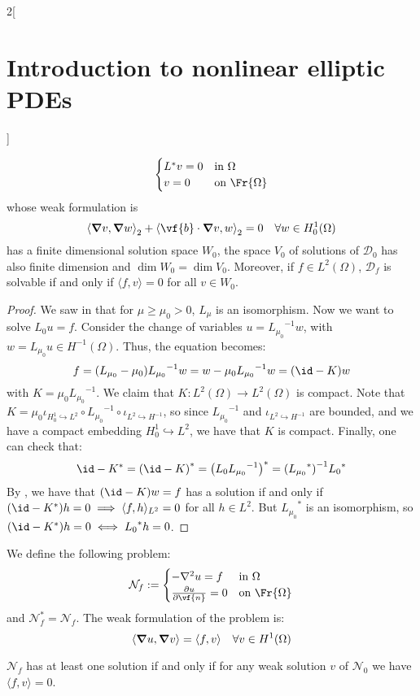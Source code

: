 \documentclass[../../../main_math.tex]{subfiles}
\begin{document}
\begin{multicols}{2}[\section{Introduction to nonlinear elliptic PDEs}]
\begin{proposition}
$$\begin{cases}
        L^*v=0 & \text{in }\Omega      \\
        v=0    & \text{on }\Fr{\Omega}
      \end{cases}
    $$
    whose weak formulation is
    \begin{equation*}
      {\langle \grad v,\grad w\rangle}_2+{\langle \vf{b}\cdot \grad v,w\rangle}_2=0\quad \forall w\in H_0^1(\Omega)
    \end{equation*}
    has a finite dimensional solution space $W_0$, the space $V_0$ of solutions of $\mathcal{D}_0$ has also finite dimension and $\dim W_0=\dim V_0$. Moreover, if $f\in L^2(\Omega)$, $\mathcal{D}_f$ is solvable if and only if $\langle f,v\rangle=0$ for all $v\in W_0$.
  \end{proposition}
  \begin{proof}
    We saw in  that for $\mu\geq \mu_0>0$, $L_\mu$ is an isomorphism. Now we want to solve $L_0u=f$. Consider the change of variables $u={L_{\mu_0}}^{-1}w$, with $w=L_{\mu_0}u\in H^{-1}(\Omega)$. Thus, the equation becomes:
    $$
      f= (L_{\mu_0}-\mu_0){L_{\mu_0}}^{-1}w=w-\mu_0 {L_{\mu_0}}^{-1}w=(\id-K)w
    $$
    with $K=\mu_0 {L_{\mu_0}}^{-1}$. We claim that $K:L^2(\Omega)\to L^2(\Omega)$ is compact. Note that $K=\mu_0\iota_{H_0^1\hookrightarrow L^2}\circ {L_{\mu_0}}^{-1}\circ \iota_{L^2\hookrightarrow H^{-1}}$, so since ${L_{\mu_0}}^{-1}$ and $\iota_{L^2\hookrightarrow H^{-1}}$ are bounded, and we have a compact embedding $H_0^1\hookrightarrow L^2$, we have that $K$ is compact. Finally, one can check that:
    $$
      \id-K^*={(\id-K)}^*={\left(L_0{L_{\mu_0}}^{-1}\right)}^*={({L_{\mu_0}}^*)}^{-1}{L_0}^{*}
    $$
    By , we have that $(\id-K)w=f$ has a solution if and only if $(\id-K^*)h=0\implies \langle f,h\rangle_{L^2} =0$ for all $h\in L^2$. But ${L_{\mu_0}}^*$ is an isomorphism, so $(\id-K^*)h=0\iff {L_0}^*h=0$.
  \end{proof}
  \begin{definition}
    We define the following problem:
    $$
      \mathcal{N}_f:=\begin{cases}
        -\laplacian u=f   & \text{in }\Omega      \\
        \pdv{u}{\vf{n}}=0 & \text{on }\Fr{\Omega}
      \end{cases}
    $$
    and $\mathcal{N}_f^*=\mathcal{N}_f$. The weak formulation of the problem is:
    \begin{equation*}
      \langle \grad u,\grad v\rangle=\langle f,v\rangle\quad \forall v\in H^1(\Omega)
    \end{equation*}
  \end{definition}
  \begin{proposition}
    $\mathcal{N}_f$ has at least one solution if and only if for any weak solution $v$ of $\mathcal{N}_0$ we have $\langle f,v\rangle=0$.
  \end{proposition}

\end{multicols}
\end{document}
